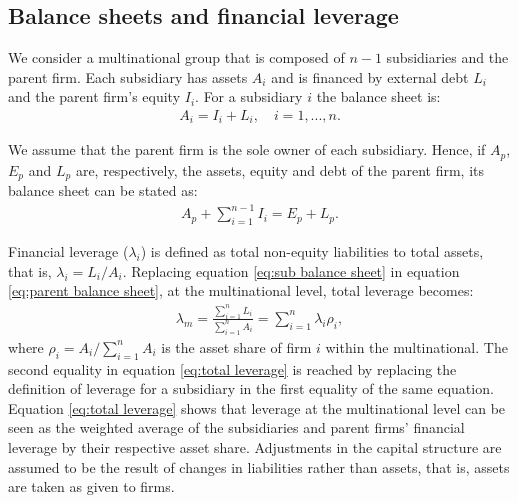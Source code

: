 \documentclass[12pt]{article}
\begin{document}
	\subsection{Balance sheets and financial leverage}
	\label{subsec:balancesheet}
	We consider a multinational group that is composed of $n-1$ subsidiaries and the parent firm. Each subsidiary has assets $A_i$ and is financed by external debt $L_i$ and the parent firm's equity $I_i$. For a subsidiary $i$ the balance sheet is:
	\begin{equation}
	\begin{aligned}
	A_i=I_i+L_i, \quad i=1,...,n.
	\end{aligned}
	\label{eq:sub balance sheet}
	\end{equation}
	
	We assume that the parent firm is the sole owner of each subsidiary. Hence, if $A_p$, $E_p$ and $L_p$ are, respectively, the assets, equity and debt of the parent firm, its balance sheet can be stated as: 
	\begin{equation}
	\begin{aligned}
	A_p+\sum_{i=1}^{n-1}I_i=E_p+L_p. 
	\end{aligned}
	\label{eq:parent balance sheet}
	\end{equation}
	
	Financial leverage ($\lambda_i$) is defined as total non-equity liabilities to total assets, that is, $\lambda_i=L_i/A_i$. Replacing equation \ref{eq:sub balance sheet} in equation \ref{eq:parent balance sheet}, at the multinational level, total leverage becomes:
	\begin{equation}
	\begin{aligned}
	\lambda_m=\frac{\sum_{i=1}^{n}L_i}{\sum_{i=1}^{n}A_i}=\sum_{i=1}^{n}\lambda_i\rho_i, 
	\end{aligned}
	\label{eq:total leverage}
	\end{equation} 
	where $\rho_i=A_i/\sum_{i=1}^{n}A_i$ is the asset share of firm $i$ within the multinational. The second equality in equation \ref{eq:total leverage} is reached by replacing the definition of leverage for a subsidiary in the first equality of the same equation. Equation \ref{eq:total leverage} shows that leverage at the multinational level can be seen as the weighted average of the subsidiaries and parent firms' financial leverage by their respective asset share. Adjustments in the capital structure are assumed to be the result of changes in liabilities rather than assets, that is, assets are taken as given to firms. 
	
\end{document}
